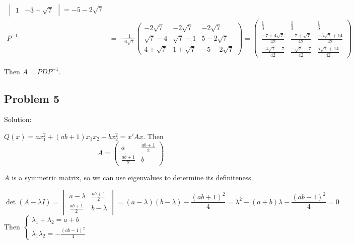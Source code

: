 \documentclass[letterpaper, 11pt]{article}
\newcommand{\1}{\mathds{1}}	%
\theoremstyle{definition}
\begin{document}
\begin{align*}
\begin{vmatrix}
                1 & -3-\sqrt{7}
              \end{vmatrix} = -5-2 \sqrt{7}                                                                                                                                         \\
  P^{-1}  & = -\frac{1}{6 \sqrt{7}} \begin{pmatrix}
                                      -2 \sqrt{7} & -2 \sqrt{7}  & -2 \sqrt{7}   \\
                                      \sqrt{7}-4  & \sqrt{7} - 1 & 5-2 \sqrt{7}  \\
                                      4+\sqrt{7}  & 1 + \sqrt{7} & -5-2 \sqrt{7}
                                    \end{pmatrix} = \begin{pmatrix}
                                                      \frac{1}{3}               & \frac{1}{3}              & \frac{1}{3}                 \\
                                                      \frac{-7+4 \sqrt{7}}{42}  & \frac{-7+\sqrt{7}}{42}   & \frac{-5 \sqrt{7} + 14}{42} \\
                                                      \frac{-4 \sqrt{7} -7}{42} & \frac{-\sqrt{7} - 7}{42} & \frac{5 \sqrt{7} + 14}{42}
                                                    \end{pmatrix}
\end{align*}

Then $A = PDP ^{-1}$.

\subsection*{Problem 5}

Solution:

$Q(x) = ax_{1}^{2} + (ab+1)x_{1}x_{2}+bx_{2}^{2} = x'Ax$. Then \[
  A = \begin{pmatrix}
    a              & \frac{ab+1}{2} \\
    \frac{ab+1}{2} & b
  \end{pmatrix}
\]

$A$ is a symmetric matrix, so we can use eigenvalues to determine its definiteness.

\[
  \det(A-\lambda I) = \begin{vmatrix}
    a-\lambda      & \frac{ab+1}{2} \\
    \frac{ab+1}{2} & b-\lambda
  \end{vmatrix} = (a-\lambda)(b-\lambda)- \frac{(ab+1)^{2}}{4} = \lambda ^{2} - (a+b)\lambda-\frac{(ab-1)^{2}}{4} = 0
\]
Then $\left\{\begin{array}{l}
    \lambda_1 + \lambda_2 = a+b \\
    \lambda_1 \lambda_2 = -\frac{(ab-1)^{2}}{4}
  \end{array}\right.$
\end{document}

